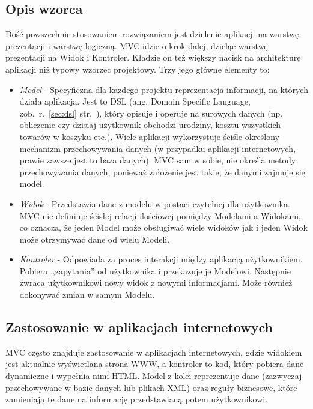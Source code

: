 \documentclass[a4paper,12pt,oneside]{report}
\begin{document}
\subsection{Opis wzorca}
\label{subsec:mvc-opis}
Dość powszechnie stosowaniem rozwiązaniem jest dzielenie aplikacji na warstwę prezentacji i warstwę logiczną. MVC idzie o krok dalej, dzieląc warstwę prezentacji na Widok i Kontroler. Kładzie on też większy nacisk na architekturę aplikacji niż typowy wzorzec projektowy. Trzy jego główne elementy to:
\begin{itemize}
  \item \emph{Model} - Specyficzna dla każdego projektu reprezentacja informacji, na których działa aplikacja. Jest to DSL (ang. Domain Specific Language, zob.~r.~\ref{sec:dsl} str.~\pageref{sec:dsl}), który opisuje i operuje na surowych danych (np. obliczenie czy dzisiaj użytkownik obchodzi urodziny, kosztu wszystkich towarów w koszyku etc.). Wiele aplikacji wykorzystuje ściśle określony mechanizm przechowywania danych (w przypadku aplikacji internetowych, prawie zawsze jest to baza danych). MVC sam w sobie, nie określa metody przechowywania danych, ponieważ założenie jest takie, że danymi zajmuje się model.
  \item \emph{Widok} - Przedstawia dane z modelu w postaci czytelnej dla użytkownika. MVC nie definiuje ścisłej relacji ilościowej pomiędzy Modelami a Widokami, co oznacza, że jeden Model może obsługiwać wiele widoków jak i jeden Widok może otrzymywać dane od wielu Modeli.
  \item \emph{Kontroler} - Odpowiada za proces interakcji między aplikacją użytkownikiem. Pobiera ,,zapytania'' od użytkownika i przekazuje je Modelowi. Następnie zwraca użytkownikowi nowy widok z nowymi informacjami. Może również dokonywać zmian w samym Modelu.
\end{itemize}

\subsection{Zastosowanie w aplikacjach internetowych}
\label{subsec:mvc-web}
MVC często znajduje zastosowanie w aplikacjach internetowych, gdzie widokiem jest aktualnie wyświetlana strona WWW, a kontroler to kod, który pobiera dane dynamiczne i wypełnia nimi HTML. Model z kolei reprezentuje dane (zazwyczaj przechowywane w bazie danych lub plikach XML) oraz reguły biznesowe, które zamieniają te dane na informację przedstawianą potem użytkownikowi.
\end{document}
